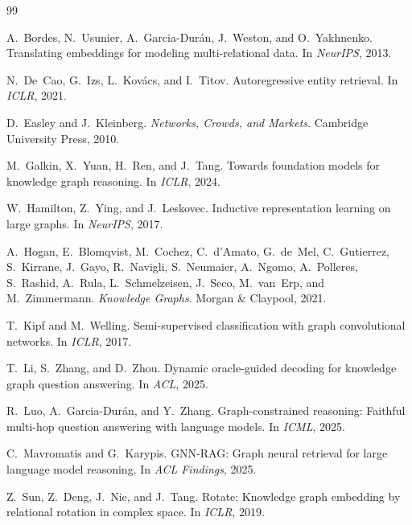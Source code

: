 \documentclass[11pt,a4paper,oneside,openany]{book}
\theoremstyle{definition}
\theoremstyle{plain}
\theoremstyle{remark}
\begin{document}
\begin{thebibliography}{99}

	A.~Bordes, N.~Usunier, A.~Garcia-Dur\'{a}n, J.~Weston, and O.~Yakhnenko.
	\newblock Translating embeddings for modeling multi-relational data.
	\newblock In \emph{NeurIPS}, 2013.

	N.~De~Cao, G.~Izs, L.~Kov\'{a}cs, and I.~Titov.
	\newblock Autoregressive entity retrieval.
	\newblock In \emph{ICLR}, 2021.

	D.~Easley and J.~Kleinberg.
	\newblock \emph{Networks, Crowds, and Markets}.
	\newblock Cambridge University Press, 2010.

	M.~Galkin, X.~Yuan, H.~Ren, and J.~Tang.
	\newblock Towards foundation models for knowledge graph reasoning.
	\newblock In \emph{ICLR}, 2024.

	W.~Hamilton, Z.~Ying, and J.~Leskovec.
	\newblock Inductive representation learning on large graphs.
	\newblock In \emph{NeurIPS}, 2017.

	A.~Hogan, E.~Blomqvist, M.~Cochez, C.~d'Amato, G.~de~Mel, C.~Gutierrez,
	S.~Kirrane, J.~Gayo, R.~Navigli, S.~Neumaier, A.~Ngomo, A.~Polleres,
	S.~Rashid, A.~Rula, L.~Schmelzeisen, J.~Seco, M.~van~Erp, and
	M.~Zimmermann.
	\newblock \emph{Knowledge Graphs}.
	\newblock Morgan \& Claypool, 2021.

	T.~Kipf and M.~Welling.
	\newblock Semi-supervised classification with graph convolutional networks.
	\newblock In \emph{ICLR}, 2017.

	T.~Li, S.~Zhang, and D.~Zhou.
	\newblock Dynamic oracle-guided decoding for knowledge graph question answering.
	\newblock In \emph{ACL}, 2025.

	R.~Luo, A.~Garcia-Dur\'{a}n, and Y.~Zhang.
	\newblock Graph-constrained reasoning: Faithful multi-hop question answering
	with language models.
	\newblock In \emph{ICML}, 2025.

	C.~Mavromatis and G.~Karypis.
	\newblock GNN-RAG: Graph neural retrieval for large language model reasoning.
	\newblock In \emph{ACL Findings}, 2025.

	Z.~Sun, Z.~Deng, J.~Nie, and J.~Tang.
	\newblock Rotate: Knowledge graph embedding by relational rotation in complex
	space.
	\newblock In \emph{ICLR}, 2019.


\end{thebibliography}
\end{document}

